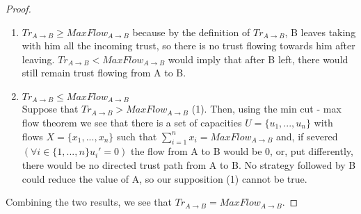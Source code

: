 \documentclass[11pt]{article}
\theoremstyle{definition}
\theoremstyle{corollary}
\begin{document}
    \begin{proof} \ 
        \begin{enumerate}
           \item $Tr_{A \rightarrow B} \geq MaxFlow_{A \rightarrow B}$ because by the definition of $Tr_{A \rightarrow B}$,
           B leaves taking with him all the incoming trust, so there is no trust flowing towards him after leaving.
           $Tr_{A \rightarrow B} < MaxFlow_{A \rightarrow B}$ would imply that after B left, there would still remain trust
           flowing from A to B.
           \item $Tr_{A \rightarrow B} \leq MaxFlow_{A \rightarrow B}$ \\
           Suppose that $Tr_{A \rightarrow B} > MaxFlow_{A \rightarrow B}$ (1). Then, using the min cut - max flow theorem we
           see that there is a set of capacities $U= \{u_1,...,u_n\}$ with flows $X = \{x_1,...,x_n\}$ such that
           $\sum_{i=1}^{n}{x_i} = MaxFlow_{A \rightarrow B}$ and, if severed $(\forall i \in \{1,...,n\} u_i' = 0)$ the flow
           from A to B would be $0$, or, put differently, there would be no directed trust path from A to B. No strategy
           followed by B could reduce the value of A, so our supposition (1) cannot be true.
        \end{enumerate}
        Combining the two results, we see that $Tr_{A \rightarrow B} = MaxFlow_{A \rightarrow B}$.
    \end{proof}
\end{document}
